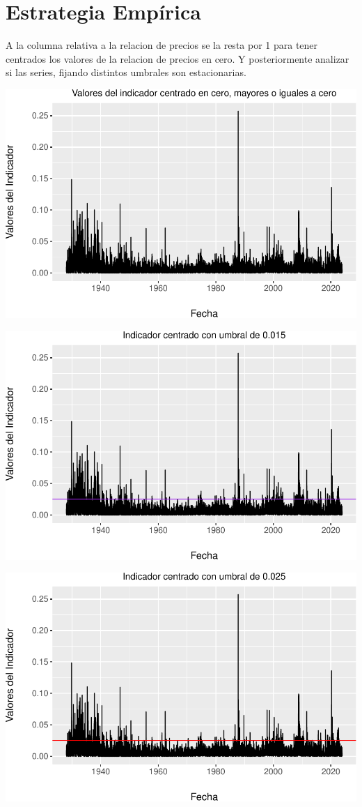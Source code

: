 \documentclass[
  oneside]{article}
\begin{document}
\newpage
\section{Estrategia Empírica}

A la columna relativa a la relacion de precios se la resta por 1 para
tener centrados los valores de la relacion de precios en cero. Y
posteriormente analizar si las series, fijando distintos umbrales son
estacionarias.

\includegraphics{main_files/figure-latex/unnamed-chunk-21-1.pdf}

\includegraphics{main_files/figure-latex/unnamed-chunk-22-1.pdf}

\includegraphics{main_files/figure-latex/unnamed-chunk-23-1.pdf}
\end{document}
